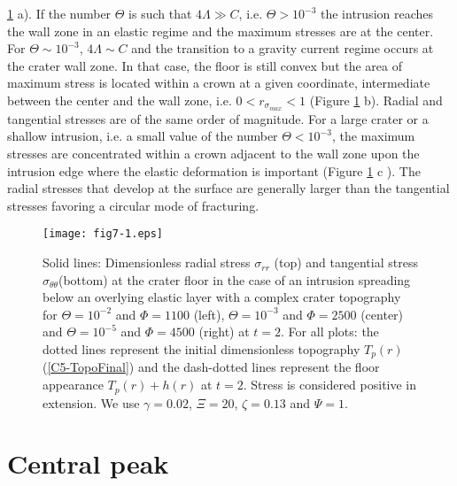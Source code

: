 \ref{C5-fig7-1} a). If the number $\Theta$ is such that $4\Lambda\gg C$,
i.e.   $\Theta>10^{-3}$ the  intrusion  reaches the  wall  zone in  an
elastic  regime and  the  maximum  stresses are  at  the center.   For
$\Theta\sim10^{-3}$, $4\Lambda \sim C$ and the transition to a gravity
current regime occurs at the crater wall zone. In that case, the floor
is still  convex but the  area of maximum  stress is located  within a
crown at a  given coordinate, intermediate between the  center and the
wall  zone, i.e.   $0<r_{\sigma_{max}}<1$ (Figure  \ref{C5-fig7-1} b).
Radial and tangential stresses are of the same order of magnitude. For
a large  crater or  a shallow  intrusion, i.e.  a  small value  of the
number $\Theta<10^{-3}$, the maximum  stresses are concentrated within
a crown  adjacent to the wall  zone upon the intrusion  edge where the
elastic  deformation is  important (Figure  \ref{C5-fig7-1} c  ).  The
radial stresses that develop at  the surface are generally larger than
the tangential stresses favoring a circular mode of fracturing.
\begin{figure}[h!]
  \begin{center}
    \graphicspath{{/Users/thorey/Documents/These/Submission/Article/FFC_JGR_2013/Paper_APRES_2nd_REVIEW/}}
    \texttt{[image: fig7-1.eps]}
    \caption{Solid  lines: Dimensionless  radial stress  $\sigma_{rr}$
      (top) and tangential  stress $\sigma_{\theta \theta}$(bottom) at
      the crater floor in the case  of an intrusion spreading below an
      overlying  elastic layer  with a  complex crater  topography for
      $\Theta=10^{-2}$  and $\Phi=1100$  (left), $\Theta=10^{-3}$  and
      $\Phi=2500$  (center)   and  $\Theta=10^{-5}$   and  $\Phi=4500$
      (right) at $t=2$. For all  plots: the dotted lines represent the
      initial  dimensionless topography  $T_p(r)$ (\ref{C5-TopoFinal})
      and  the  dash-dotted  lines   represent  the  floor  appearance
      $T_p(r)+h(r)$  at  $t=2$.   Stress  is  considered  positive  in
      extension.   We use  $\gamma=0.02$,  $\Xi=20$, $\zeta=0.13$  and
      $\Psi=1$.}
    \label{C5-fig7-1}
  \end{center}
\end{figure}

\section{Central peak}
\label{C5-AppendixC}

